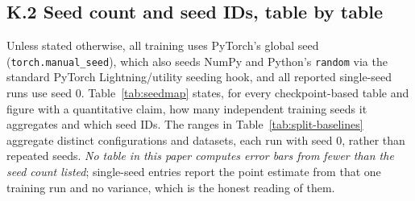 \documentclass[letterpaper]{article} %
\begin{document}
\subsection{K.2 Seed count and seed IDs, table by table}

Unless stated otherwise, all training uses PyTorch's global seed
(\texttt{torch.manual\_seed}), which also seeds NumPy and Python's
\texttt{random} via the standard PyTorch Lightning/utility seeding hook, and
all reported single-seed runs use seed $0$. Table~\ref{tab:seedmap} states,
for every checkpoint-based table and figure with a quantitative claim, how
many independent training seeds it aggregates and which seed IDs. The ranges
in Table~\ref{tab:split-baselines} aggregate distinct configurations and
datasets, each run with seed 0, rather than repeated seeds. \emph{No table in this
paper computes error bars from fewer than the seed count listed}; single-seed
entries report the point estimate from that one training run and no
variance, which is the honest reading of them.
\end{document}
